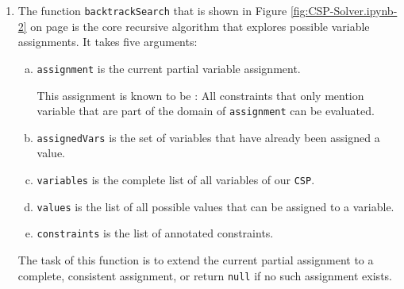 \begin{enumerate}
\item The function \texttt{backtrackSearch} that is shown in Figure \ref{fig:CSP-Solver.ipynb-2} on page
  \pageref{fig:CSP-Solver.ipynb-2} is the core recursive algorithm that explores possible variable
  assignments. It takes five arguments: 
  \begin{enumerate}[(a)]
  \item \texttt{assignment} is the current partial variable assignment.

    This assignment is known to be : All constraints that only mention variable that
    are part of the domain of \texttt{assignment} can be evaluated.
  \item \texttt{assignedVars} is the set of variables that have already been assigned a value.
  \item \texttt{variables} is the complete list of all variables of our \texttt{CSP}.
  \item \texttt{values} is the list of all possible values that can be assigned to a variable.
  \item \texttt{constraints} is the list of annotated constraints.
  \end{enumerate}
  The task of this function is to extend the current partial assignment to a complete, consistent assignment, or return \texttt{null} if no such assignment exists.


\end{enumerate}
